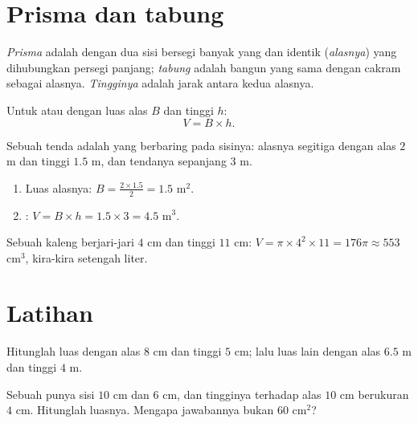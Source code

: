 \section{Prisma dan tabung}

\begin{definition}\label{def:g7:areas:prism}
\emph{Prisma} adalah  dengan dua sisi
bersegi banyak yang  dan identik (\emph{alasnya}) yang
dihubungkan persegi panjang; \emph{tabung} adalah bangun
yang sama dengan cakram sebagai alasnya. \emph{Tingginya} adalah jarak
antara kedua alasnya.
\end{definition}

\begin{theorem}[Volume]\label{thm:g7:areas:volume}
Untuk  atau  dengan luas alas $B$ dan tinggi $h$:
\[
V = B \times h .
\]
\end{theorem}
\admitted

\begin{example}\label{ex:g7:areas:volume}
Sebuah tenda adalah  yang berbaring pada sisinya: alasnya
segitiga dengan alas $2$ m dan tinggi $1.5$ m, dan tendanya sepanjang $3$ m.
\begin{enumerate}
  \item Luas alasnya: $B = \frac{2 \times 1.5}{2} = 1.5$ m$^2$.
  \item {}: $V = B \times h = 1.5 \times 3 = 4.5$ m$^3$.
\end{enumerate}
Sebuah kaleng berjari-jari $4$ cm dan tinggi $11$ cm:
$V = \pi \times 4^2 \times 11 = 176\pi \approx 553$ cm$^3$, kira-kira
setengah liter.
\end{example}

\section{Latihan}

\begin{exercise}[$\star$]\label{exo:g7:areas:1}
Hitunglah luas  dengan alas $8$ cm dan tinggi
$5$ cm; lalu luas  lain dengan alas $6.5$ m dan tinggi $4$ m.
\end{exercise}

\begin{exercise}[$\star$]\label{exo:g7:areas:2}
Sebuah  punya sisi $10$ cm dan $6$ cm, dan tingginya
terhadap alas $10$ cm berukuran $4$ cm. Hitunglah luasnya. Mengapa
jawabannya bukan $60$ cm$^2$?
\end{exercise}

